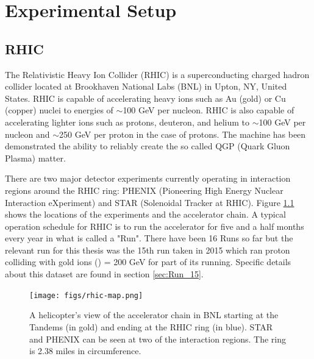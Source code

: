 \chapter{Experimental Setup}
\section{RHIC}
The Relativistic Heavy Ion Collider (RHIC) is a superconducting charged hadron collider located at Brookhaven National Labs (BNL) in Upton, NY, United States. RHIC is capable of accelerating heavy ions such as Au (gold) or Cu (copper) nuclei to energies of $\sim	$100 GeV per nucleon. RHIC is also capable of accelerating lighter ions such as protons, deuteron, and helium to $\sim	$100 GeV per nucleon and $\sim	$250 GeV per proton in the case of protons. The machine has been demonstrated the ability to reliably create the so called QGP (Quark Gluon Plasma) matter.

There are two major detector experiments currently operating in interaction regions around the RHIC ring: PHENIX (Pioneering High Energy Nuclear Interaction eXperiment) and STAR (Solenoidal Tracker at RHIC). Figure \ref{fig:rhic_heli_photo} shows the locations of the experiments and the accelerator chain. A typical operation schedule for RHIC is to run the accelerator for five and a half months every year in what is called a "Run". There have been 16 Runs so far but the relevant run for this thesis was the 15th run taken in 2015 which ran proton colliding with gold ions (\pau) \sqsn = 200 GeV for part of its running. Specific details about this dataset are found in section \ref{sec:Run_15}.

\begin{figure}[!ht]
\begin{center}
\texttt{[image: figs/rhic-map.png]}
\caption{A helicopter's view of the accelerator chain in BNL starting at the Tandems (in gold) and ending at the RHIC ring (in blue). STAR and PHENIX can be seen at two of the interaction regions. The ring is 2.38 miles in circumference.}
\label{fig:rhic_heli_photo}
\end{center}
\end{figure}

